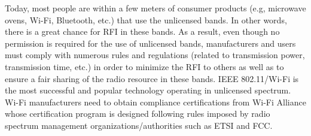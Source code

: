 Today, most people are within a few meters of consumer products (e.g, microwave ovens, \mbox{Wi-Fi}, Bluetooth, etc.) that use the unlicensed bands. In other words, there is a great chance for RFI in these bands. As a result, even though no permission is required for the use of unlicensed bands, manufacturers and users must comply with numerous rules and regulations (related to transmission power, transmission time, etc.) in order to minimize the RFI to others as well as to ensure a fair sharing of the radio resource in these bands. IEEE 802.11/\mbox{Wi-Fi} is the most successful and popular technology operating in unlicensed spectrum. \mbox{Wi-Fi} manufacturers need to obtain compliance certifications from \mbox{Wi-Fi} Alliance whose certification program is designed following rules imposed by radio spectrum management organizations/authorities such as ETSI and FCC. 

